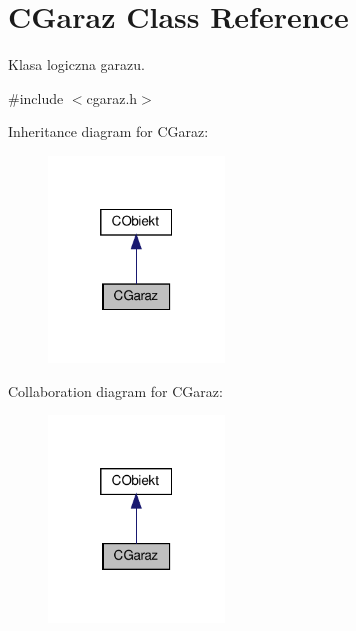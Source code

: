 \hypertarget{class_c_garaz}{}\section{C\+Garaz Class Reference}
\label{class_c_garaz}


Klasa logiczna garazu.  




{\ttfamily \#include $<$cgaraz.\+h$>$}



Inheritance diagram for C\+Garaz\+:\nopagebreak
\begin{figure}[H]
\begin{center}
\leavevmode
\includegraphics[width=133pt]{class_c_garaz__inherit__graph}
\end{center}
\end{figure}


Collaboration diagram for C\+Garaz\+:\nopagebreak
\begin{figure}[H]
\begin{center}
\leavevmode
\includegraphics[width=133pt]{class_c_garaz__coll__graph}
\end{center}
\end{figure}
